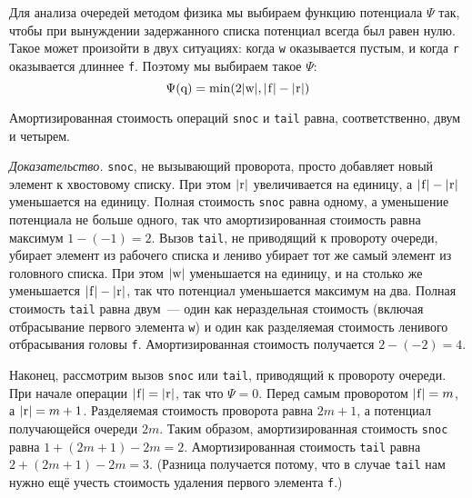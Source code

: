 Для анализа очередей методом физика мы выбираем функцию потенциала
$\Psi$ так, чтобы при вынуждении задержанного списка потенциал всегда был
равен нулю. Такое может произойти в двух ситуациях: когда
\lstinline!w! оказывается пустым, и когда \lstinline!r! оказывается
длиннее \lstinline!f!. Поэтому мы выбираем такое $\Psi$:
$$
\Psi(\lstinline!q!) = \min(2|\lstinline!w!|, |\lstinline!f!| - |\lstinline!r!|)
$$
\begin{theorem}\label{th:6.2}
  Амортизированная стоимость операций \lstinline!snoc! и
  \lstinline!tail! равна, соответственно, двум и четырем.

  \emph{Доказательство.} \lstinline!snoc!, не вызывающий проворота,
  просто добавляет новый элемент к хвостовому списку. При этом
  $|\lstinline!r!|$ увеличивается на единицу, а $|\lstinline!f!| -
  |\lstinline!r!|$ уменьшается на единицу. Полная стоимость
  \lstinline!snoc! равна одному, а уменьшение потенциала не больше
  одного, так что амортизированная стоимость равна максимум $1 - (-1)
  = 2$. Вызов \lstinline!tail!, не приводящий к провороту очереди,
  убирает элемент из рабочего списка и лениво убирает тот же самый
  элемент из головного списка. При этом $|\lstinline!w!|$ уменьшается
  на единицу, и на столько же уменьшается $|\lstinline!f!| -
  |\lstinline!r!|$, так что потенциал уменьшается максимум на два.
  Полная стоимость \lstinline!tail! равна двум~--- один как
  нераздельная стоимость (включая отбрасывание первого элемента
  \lstinline!w!) и один как разделяемая стоимость ленивого
  отбрасывания головы \lstinline!f!. Амортизированная стоимость
  получается $2 - (-2) = 4$.

  Наконец, рассмотрим вызов \lstinline!snoc! или \lstinline!tail!,
  приводящий к провороту очереди. При начале операции $|\lstinline!f!|
  = |\lstinline!r!|$, так что $\Psi = 0$. Перед самым проворотом
  $|\lstinline!f!| = m$, а $|\lstinline!r!| = m+1$. Разделяемая
  стоимость проворота равна $2m+1$, а потенциал получающейся очереди
  $2m$. Таким образом, амортизированная стоимость \lstinline!snoc!
  равна $1 + (2m + 1) - 2m = 2$. Амортизированная стоимость
  \lstinline!tail!  равна $2 + (2m + 1) - 2m = 3$. (Разница получается
  потому, что в случае \lstinline!tail! нам нужно ещё учесть стоимость
  удаления первого элемента \lstinline!f!.)
\end{theorem}

